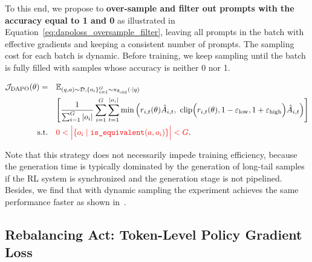To this end, we propose to \textbf{over-sample and filter out prompts with the accuracy equal to 1 and 0} as illustrated in Equation~\ref{eq:dapoloss_oversample_filter}, leaving all prompts in the batch with effective gradients and keeping a consistent number of prompts. The sampling cost for each batch is dynamic. Before training, we keep sampling until the batch is fully filled with samples whose accuracy is neither 0 nor 1.

\begin{equation}
\begin{aligned}
\mathcal{J}_{\text{DAPO}}(\theta) =\quad& \mathbb{E}_{(q,a)\sim \mathcal{D}, \{o_i\}_{i=1}^G\sim \pi_{\theta_\text{old}}(\cdot\mid q)}\\&
\Bigg[\frac{1}{\sum_{i=1}^{G}|o_i|}\sum_{i=1}^{G}\sum_{t=1}^{|o_i|} 
\min \Big( r_{i,t}(\theta) \hat{A}_{i,t},  
\ \text{clip} \Big( r_{i,t}(\theta), 1 - {\varepsilon_{\text{low}}}, 1 + {\varepsilon_{\text{high}}} \Big) \hat{A}_{i,t} \Big) \Bigg]
\\
\text{s.t.}\quad& {\color{red}0< \Big|\{o_i\mid\texttt{is\_equivalent}(a,o_i)\}\Big|< G}.
\label{eq:dapoloss_oversample_filter}
\end{aligned}
\end{equation}

Note that this strategy does not necessarily impede training efficiency, because the generation time is typically dominated by the generation of long-tail samples if the RL system is synchronized and the generation stage is not pipelined. Besides, we find that with dynamic sampling the experiment achieves the same performance faster as shown in~.



\subsection{Rebalancing Act: Token-Level Policy Gradient Loss}
\label{sec:tokenlevel}

